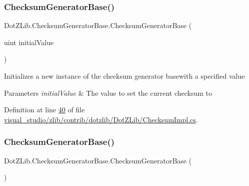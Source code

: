 \subsubsection{\texorpdfstring{Checksum\+Generator\+Base()}{ChecksumGeneratorBase()}\hspace{0.1cm}{\footnotesize\ttfamily [2/4]}}
{\footnotesize\ttfamily Dot\+Z\+Lib.\+Checksum\+Generator\+Base.\+Checksum\+Generator\+Base (\begin{DoxyParamCaption}\item[{uint}]{initial\+Value }\end{DoxyParamCaption})\hspace{0.3cm}{\ttfamily [inline]}}



Initializes a new instance of the checksum generator basewith a specified value 


\begin{DoxyParams}{Parameters}
{\em initial\+Value} & The value to set the current checksum to\\
\hline
\end{DoxyParams}


Definition at line \hyperlink{visual__studio_2zlib_2contrib_2dotzlib_2_dot_z_lib_2_checksum_impl_8cs_source_l00040}{40} of file \hyperlink{visual__studio_2zlib_2contrib_2dotzlib_2_dot_z_lib_2_checksum_impl_8cs_source}{visual\+\_\+studio/zlib/contrib/dotzlib/\+Dot\+Z\+Lib/\+Checksum\+Impl.\+cs}.

\mbox{\label{class_dot_z_lib_1_1_checksum_generator_base_a4c13ec1d2cb08abadffb2c70cb4ba258}} 
\subsubsection{\texorpdfstring{Checksum\+Generator\+Base()}{ChecksumGeneratorBase()}\hspace{0.1cm}{\footnotesize\ttfamily [3/4]}}
{\footnotesize\ttfamily Dot\+Z\+Lib.\+Checksum\+Generator\+Base.\+Checksum\+Generator\+Base (\begin{DoxyParamCaption}{ }\end{DoxyParamCaption})\hspace{0.3cm}{\ttfamily [inline]}}



